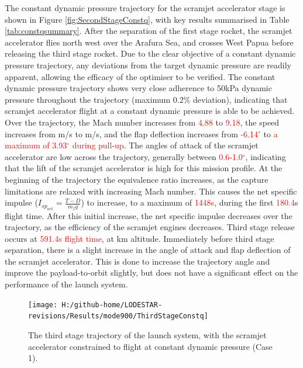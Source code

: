 The constant dynamic pressure trajectory for the scramjet accelerator stage is shown in Figure \ref{fig:SecondStageConstq}, with key results summarised in Table \ref{tab:constqsummary}. After the separation of the first stage rocket, the scramjet accelerator flies north west over the Arafura Sea, and crosses West Papua before releasing the third stage rocket. Due to the clear objective of a constant dynamic pressure trajectory, any deviations from the target dynamic pressure are readily apparent, allowing the efficacy of the optimiser to be verified. 
The constant dynamic pressure trajectory shows very close adherence to 50kPa dynamic pressure  throughout the trajectory (maximum 0.2\% deviation), indicating that scramjet accelerator flight at a constant dynamic pressure is able to be achieved.  
Over the trajectory, the Mach number increases from \textcolor{red}{4.88} to \textcolor{red}{9.18}, the speed increases from \firstsecondSeparationvConstqNoReturn m/s to \secondthirdSeparationvConstqNoReturn m/s, and the flap deflection increases from \textcolor{red}{-6.14}$^\circ$ to \textcolor{red}{a maximum of 3.93$^\circ$ during pull-up}. The angles of attack of the scramjet accelerator are low across the trajectory, generally between \textcolor{red}{0.6-1.0}$^\circ$, indicating that the lift of the scramjet accelerator is high for this mission profile. At the beginning of the trajectory the equivalence ratio increases, as the capture limitations are relaxed with increasing Mach number. This causes the net specific impulse ($I_{sp_{net}} = \frac{T-D}{\dot{m}_f g}$) to increase, to a maximum of \textcolor{red}{1448s}, during the first \textcolor{red}{180.4}s flight time.  After this initial increase, the net specific impulse decreases over the trajectory, as the efficiency of the scramjet engines decreases. 
Third stage release occurs at \textcolor{red}{591.4s flight time}, at \secondthirdSeparationAltConstqNoReturn km altitude. Immediately before third stage separation, there is a slight increase in the angle of attack and flap deflection of the scramjet accelerator. This is done to increase the trajectory angle and improve the payload-to-orbit slightly, but does not have a significant effect on the performance of the launch system. 

\begin{figure}[ht!]%
\centering
\texttt{[image: H:/github-home/LODESTAR-revisions/Results/mode900/ThirdStageConstq]}
\caption{The third stage trajectory of the launch system, with the scramjet accelerator constrained to flight at constant dynamic pressure (Case 1).}
\label{fig:ThirdStageConstq}
\end{figure}

